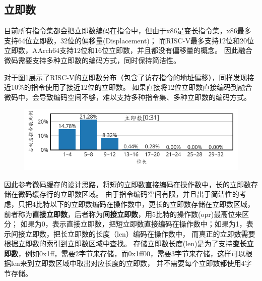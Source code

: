 \subsection{立即数}

目前所有指令集都会把立即数编码在指令中，但由于x86是变长指令集，x86最多支持64位立即数，32位的偏移量(Displacement)；
而RISC-V最多支持12位和20位立即数，AArch64支持12位和16位立即数，并且都没有偏移量的概念。
因此融合微码需要支持多种立即数的编码方式，同时保持简洁性。

对于图\ref{img:immsize_riscv}展示了RISC-V的立即数分布（包含了访存指令的地址偏移），同样发现接近10\%的指令使用了接近12位的立即数。
如果直接将12位立即数直接编码到融合微码中，会导致编码空间不够，难以支持多种指令集、多种立即数的编码方式。


\begin{figure}[h]
  \centering
  \includegraphics[width=0.8\linewidth]{./plot_pdf/immsize_riscv.pdf}
  \label{img:immsize_riscv}
\end{figure}

因此参考微码缓存的设计思路，将短的立即数直接编码在操作数中，长的立即数存储在微码缓存行的立即数区域。
由于指令编码空间有限，并且出于简洁性的考虑，只把4比特以下的立即数编码在操作数中，更长的立即数存储在立即数区域，
前者称为\textbf{直接立即数}，后者称为\textbf{间接立即数}，用5比特的操作数(opr)最高位来区分；
如果为0，表示直接立即数，把短立即数直接编码在操作数中；如果为1，表示间接立即数，把长立即数的长度（len）编码在操作数中，
而真正的立即数需要根据立即数的索引到立即数区域中查找。
存储立即数长度(len)是为了支持\textbf{变长立即数}，例如0x1ff，需要2字节来存储，而0x1ff00，需要3字节来存储，这样可以根据len来到立即数区域中取出对应长度的立即数，
并不需要每个立即数都使用4字节存储。



